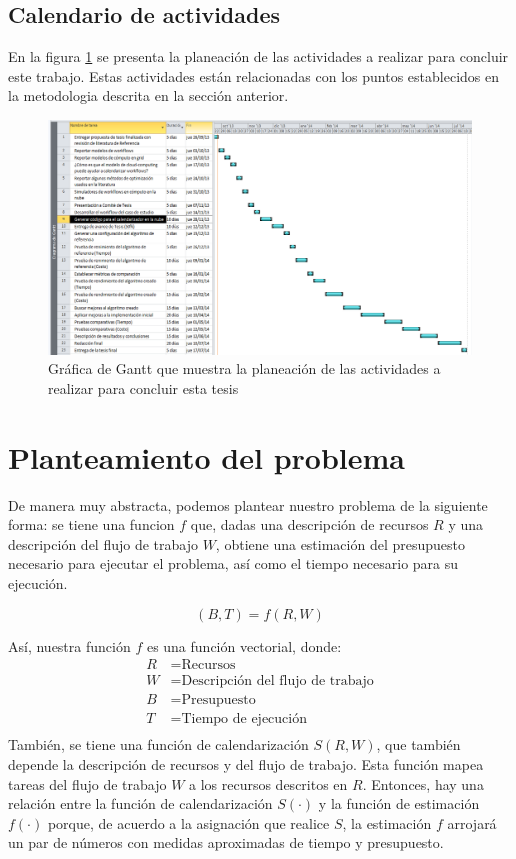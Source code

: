 \documentclass[letterpaper, 12pt]{report}
\begin{document}
\section*{Calendario de actividades}
En la figura \ref{fig:gantt} se presenta la planeación de las actividades a realizar para concluir este trabajo. Estas actividades están relacionadas con los puntos establecidos en la metodologia descrita en la sección anterior.

\begin{figure}[!H]
    \begin{center}
        \includegraphics[scale=0.7,angle=90]{imagenes/gantt}
    \end{center}
    \caption{Gráfica de Gantt que muestra la planeación de las actividades a realizar para concluir esta tesis}
    \label{fig:gantt}
\end{figure}

\chapter*{Planteamiento del problema}
De manera muy abstracta, podemos plantear nuestro problema de la siguiente forma: se tiene una funcion $f$ que, dadas una descripción de recursos $R$ y una descripción del flujo de trabajo $W$, obtiene una estimación del presupuesto necesario para ejecutar el problema, así como el tiempo necesario para su ejecución. 

\begin{equation}
(B, T) = f(R, W)
\end{equation}

Así, nuestra función $f$ es una función vectorial, donde:
\begin{align*}
R &= \text{Recursos} \\
W  &= \text{Descripción del flujo de trabajo} \\
B &= \text{Presupuesto} \\
T &= \text{Tiempo de ejecución} \\
\end{align*}
También, se tiene una función de calendarización $S(R, W)$, que también depende la descripción de recursos y del flujo de trabajo. Esta función mapea tareas del flujo de trabajo $W$ a los recursos descritos en $R$. Entonces, hay una relación entre la función de calendarización $S( \cdot )$ y la función de estimación $f( \cdot )$ porque, de acuerdo a la asignación que realice $S$, la estimación $f$ arrojará un par de números con medidas aproximadas de tiempo y presupuesto.
\end{document}
